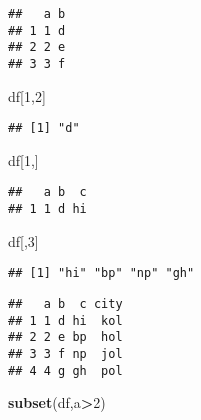 \documentclass[
]{article}
\newenvironment{Shaded}{\begin{snugshade}}{\end{snugshade}}
\newcommand{\DecValTok}[1]{\textcolor[rgb]{0.00,0.00,0.81}{#1}}
\newcommand{\FunctionTok}[1]{\textcolor[rgb]{0.13,0.29,0.53}{\textbf{#1}}}
\newcommand{\NormalTok}[1]{#1}
\newcommand{\OtherTok}[1]{\textcolor[rgb]{0.56,0.35,0.01}{#1}}
\newcommand{\SpecialCharTok}[1]{\textcolor[rgb]{0.81,0.36,0.00}{\textbf{#1}}}
\newcommand{\StringTok}[1]{\textcolor[rgb]{0.31,0.60,0.02}{#1}}
\begin{document}
\begin{verbatim}
##   a b
## 1 1 d
## 2 2 e
## 3 3 f
\end{verbatim}

\begin{Shaded}
\begin{Highlighting}[]
\NormalTok{df[}\DecValTok{1}\NormalTok{,}\DecValTok{2}\NormalTok{]}
\end{Highlighting}
\end{Shaded}

\begin{verbatim}
## [1] "d"
\end{verbatim}

\begin{Shaded}
\begin{Highlighting}[]
\NormalTok{df[}\DecValTok{1}\NormalTok{,]}
\end{Highlighting}
\end{Shaded}

\begin{verbatim}
##   a b  c
## 1 1 d hi
\end{verbatim}

\begin{Shaded}
\begin{Highlighting}[]
\NormalTok{df[,}\DecValTok{3}\NormalTok{]}
\end{Highlighting}
\end{Shaded}

\begin{verbatim}
## [1] "hi" "bp" "np" "gh"
\end{verbatim}

\begin{Shaded}
\end{Shaded}

\begin{verbatim}
##   a b  c city
## 1 1 d hi  kol
## 2 2 e bp  hol
## 3 3 f np  jol
## 4 4 g gh  pol
\end{verbatim}

\begin{Shaded}
\begin{Highlighting}[]
\FunctionTok{subset}\NormalTok{(df,a}\SpecialCharTok{\textgreater{}}\DecValTok{2}\NormalTok{)}
\end{Highlighting}
\end{Shaded}
\end{document}
